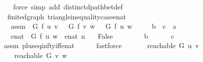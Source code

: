 \begin{isabellebody}
\ \ \isamarkupfalse%
\ {\isacharparenleft}{\kern0pt}force\ simp\ add{\isacharcolon}{\kern0pt}\ distinct{\isacharunderscore}{\kern0pt}dpath{\isacharunderscore}{\kern0pt}bet{\isacharunderscore}{\kern0pt}def{\isacharparenright}{\kern0pt}%
\endisatagproof
{\isafoldproof}%
%
\isadelimproof
\isanewline
%
\endisadelimproof
%
\isadeliminvisible
\isanewline
%
\endisadeliminvisible
%
\isataginvisible
{}\isamarkupfalse%
\ {\isacharparenleft}{\kern0pt}\ finite{\isacharunderscore}{\kern0pt}dgraph{\isacharparenright}{\kern0pt}\ {\isasymdelta}{\isacharunderscore}{\kern0pt}triangle{\isacharunderscore}{\kern0pt}inequality{\isacharunderscore}{\kern0pt}case{\isacharunderscore}{\kern0pt}enat{\isacharcolon}{\kern0pt}\isanewline
\ \ \ assm{\isacharcolon}{\kern0pt}\ {\isachardoublequoteopen}{\isasymdelta}\ G\ f\ u\ v\ {\isacharplus}{\kern0pt}\ {\isasymdelta}\ G\ f\ v\ w\ {\isacharless}{\kern0pt}\ {\isasymdelta}\ G\ f\ u\ w{\isachardoublequoteclose}\isanewline
\ \ \ \ {\isacharparenleft}{\kern0pt}\ {\isachardoublequoteopen}{\isacharquery}{\kern0pt}b\ {\isacharplus}{\kern0pt}\ {\isacharquery}{\kern0pt}c\ {\isacharless}{\kern0pt}\ {\isacharquery}{\kern0pt}a{\isachardoublequoteclose}{\isacharparenright}{\kern0pt}\isanewline
\ \ \ enat{\isacharcolon}{\kern0pt}\ {\isachardoublequoteopen}{\isasymdelta}\ G\ f\ u\ w\ {\isacharequal}{\kern0pt}\ enat\ n{\isachardoublequoteclose}\isanewline
\ \ \ {\isachardoublequoteopen}False{\isachardoublequoteclose}%
\endisataginvisible
{\isafoldinvisible}%
%
\isadeliminvisible
\isanewline
%
\endisadeliminvisible
%
\isadelimproof
%
\endisadelimproof
%
\isatagproof
{}\isamarkupfalse%
\ {\isacharminus}{\kern0pt}\isanewline
\ \ \isamarkupfalse%
\isanewline
\ \ \ \ {\isachardoublequoteopen}{\isacharquery}{\kern0pt}b\ {\isasymnoteq}\ {\isasyminfinity}{\isachardoublequoteclose}\isanewline
\ \ \ \ {\isachardoublequoteopen}{\isacharquery}{\kern0pt}c\ {\isasymnoteq}\ {\isasyminfinity}{\isachardoublequoteclose}\isanewline
\ \ \ \ \isamarkupfalse%
\ assm\ plus{\isacharunderscore}{\kern0pt}eq{\isacharunderscore}{\kern0pt}infty{\isacharunderscore}{\kern0pt}iff{\isacharunderscore}{\kern0pt}enat\isanewline
\ \ \ \ \isamarkupfalse%
\ fastforce{\isacharplus}{\kern0pt}\isanewline
\ \ \isamarkupfalse%
\isanewline
\ \ \ \ {\isachardoublequoteopen}reachable\ G\ u\ v{\isachardoublequoteclose}\isanewline
\ \ \ \ {\isachardoublequoteopen}reachable\ G\ v\ w{\isachardoublequoteclose}\isanewline

\end{isabellebody}
